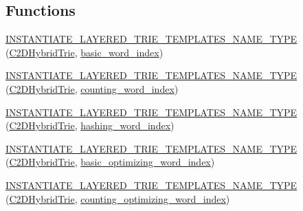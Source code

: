 \subsection*{Functions}
\begin{DoxyCompactItemize}
\item 
\hyperlink{namespaceuva_1_1smt_1_1bpbd_1_1server_1_1lm_a4f8e4a65e971552b3149f0dc9a7e5e3c}{I\+N\+S\+T\+A\+N\+T\+I\+A\+T\+E\+\_\+\+L\+A\+Y\+E\+R\+E\+D\+\_\+\+T\+R\+I\+E\+\_\+\+T\+E\+M\+P\+L\+A\+T\+E\+S\+\_\+\+N\+A\+M\+E\+\_\+\+T\+Y\+P\+E} (\hyperlink{classuva_1_1smt_1_1bpbd_1_1server_1_1lm_1_1_c2_d_hybrid_trie}{C2\+D\+Hybrid\+Trie}, \hyperlink{classuva_1_1smt_1_1bpbd_1_1server_1_1lm_1_1dictionary_1_1basic__word__index}{basic\+\_\+word\+\_\+index})
\item 
\hyperlink{namespaceuva_1_1smt_1_1bpbd_1_1server_1_1lm_a07edd63de176279fcd83cae69a2a9198}{I\+N\+S\+T\+A\+N\+T\+I\+A\+T\+E\+\_\+\+L\+A\+Y\+E\+R\+E\+D\+\_\+\+T\+R\+I\+E\+\_\+\+T\+E\+M\+P\+L\+A\+T\+E\+S\+\_\+\+N\+A\+M\+E\+\_\+\+T\+Y\+P\+E} (\hyperlink{classuva_1_1smt_1_1bpbd_1_1server_1_1lm_1_1_c2_d_hybrid_trie}{C2\+D\+Hybrid\+Trie}, \hyperlink{classuva_1_1smt_1_1bpbd_1_1server_1_1lm_1_1dictionary_1_1counting__word__index}{counting\+\_\+word\+\_\+index})
\item 
\hyperlink{namespaceuva_1_1smt_1_1bpbd_1_1server_1_1lm_af2374b99b8d15665135856d04e4f32dc}{I\+N\+S\+T\+A\+N\+T\+I\+A\+T\+E\+\_\+\+L\+A\+Y\+E\+R\+E\+D\+\_\+\+T\+R\+I\+E\+\_\+\+T\+E\+M\+P\+L\+A\+T\+E\+S\+\_\+\+N\+A\+M\+E\+\_\+\+T\+Y\+P\+E} (\hyperlink{classuva_1_1smt_1_1bpbd_1_1server_1_1lm_1_1_c2_d_hybrid_trie}{C2\+D\+Hybrid\+Trie}, \hyperlink{classuva_1_1smt_1_1bpbd_1_1server_1_1lm_1_1dictionary_1_1hashing__word__index}{hashing\+\_\+word\+\_\+index})
\item 
\hyperlink{namespaceuva_1_1smt_1_1bpbd_1_1server_1_1lm_a6807c0927cd16dba40327d814871130d}{I\+N\+S\+T\+A\+N\+T\+I\+A\+T\+E\+\_\+\+L\+A\+Y\+E\+R\+E\+D\+\_\+\+T\+R\+I\+E\+\_\+\+T\+E\+M\+P\+L\+A\+T\+E\+S\+\_\+\+N\+A\+M\+E\+\_\+\+T\+Y\+P\+E} (\hyperlink{classuva_1_1smt_1_1bpbd_1_1server_1_1lm_1_1_c2_d_hybrid_trie}{C2\+D\+Hybrid\+Trie}, \hyperlink{namespaceuva_1_1smt_1_1bpbd_1_1server_1_1lm_1_1dictionary_a3001583c904eec702b4a4125082a7ecd}{basic\+\_\+optimizing\+\_\+word\+\_\+index})
\item 
\hyperlink{namespaceuva_1_1smt_1_1bpbd_1_1server_1_1lm_a65a1886f6f56717a0a915685db94a7ae}{I\+N\+S\+T\+A\+N\+T\+I\+A\+T\+E\+\_\+\+L\+A\+Y\+E\+R\+E\+D\+\_\+\+T\+R\+I\+E\+\_\+\+T\+E\+M\+P\+L\+A\+T\+E\+S\+\_\+\+N\+A\+M\+E\+\_\+\+T\+Y\+P\+E} (\hyperlink{classuva_1_1smt_1_1bpbd_1_1server_1_1lm_1_1_c2_d_hybrid_trie}{C2\+D\+Hybrid\+Trie}, \hyperlink{namespaceuva_1_1smt_1_1bpbd_1_1server_1_1lm_1_1dictionary_a61cbd647b15de785ccf4cdd26661c366}{counting\+\_\+optimizing\+\_\+word\+\_\+index})

\end{DoxyCompactItemize}
